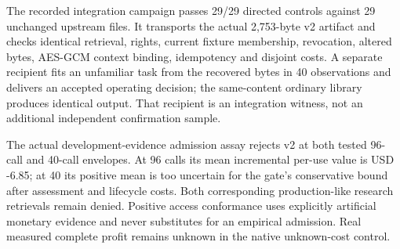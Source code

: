 The recorded integration campaign passes 29/29 directed controls against 29 unchanged upstream files. It transports the actual 2,753-byte v2 artifact and checks identical retrieval, rights, current fixture membership, revocation, altered bytes, AES-GCM context binding, idempotency and disjoint costs. A separate recipient fits an unfamiliar task from the recovered bytes in 40 observations and delivers an accepted operating decision; the same-content ordinary library produces identical output. That recipient is an integration witness, not an additional independent confirmation sample.

The actual development-evidence admission assay rejects v2 at both tested 96-call and 40-call envelopes. At 96 calls its mean incremental per-use value is USD -6.85; at 40 its positive mean is too uncertain for the gate's conservative bound after assessment and lifecycle costs. Both corresponding production-like research retrievals remain denied. Positive access conformance uses explicitly artificial monetary evidence and never substitutes for an empirical admission. Real measured complete profit remains unknown in the native unknown-cost control.
